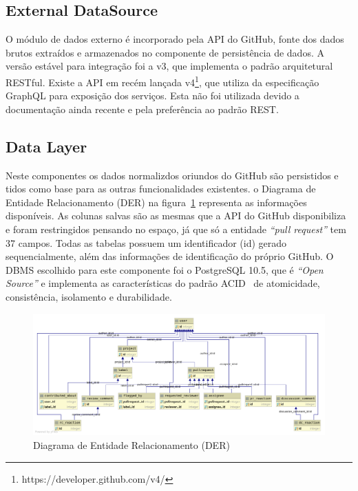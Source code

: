 \documentclass[12pt,openany,oneside,a4paper,english,brazil]{abntbibufjf}
\begin{document}
    \subsection{External DataSource}

    O módulo de dados externo é incorporado pela API do GitHub, fonte dos dados brutos extraídos e armazenados no componente de persistência de dados. A versão estável para integração foi a v3, que implementa o padrão arquitetural RESTful\cite{fielding2002}. Existe a API em recém lançada v4\footnote{https://developer.github.com/v4/}, que utiliza da especificação GraphQL para exposição dos serviços. Esta não foi utilizada devido a documentação ainda recente e pela preferência ao padrão REST.

    \subsection{Data Layer}

    Neste componentes os dados normalizdos oriundos do GitHub são persistidos e tidos como base para as outras funcionalidades existentes. o Diagrama de Entidade Relacionamento (DER) na figura~\ref{fig:der} representa as informações disponíveis. As colunas salvas são as mesmas que a API do GitHub disponibiliza e foram restringidos pensando no espaço, já que só a entidade \textit{``pull request''} tem 37 campos. Todas as tabelas possuem um identificador (id) gerado sequencialmente, além das informações de identificação do próprio GitHub.  O DBMS escolhido para este componente foi o PostgreSQL 10.5, que é \textit{``Open Source''} e implementa as características do padrão ACID~\cite{gilbert2002} de atomicidade, consistência, isolamento e durabilidade.

    \begin{figure}[!htbp]
     \includegraphics[width=\linewidth]{der}
     \caption{ Diagrama de Entidade Relacionamento (DER)}\label{fig:der}
    \end{figure}
\end{document}
